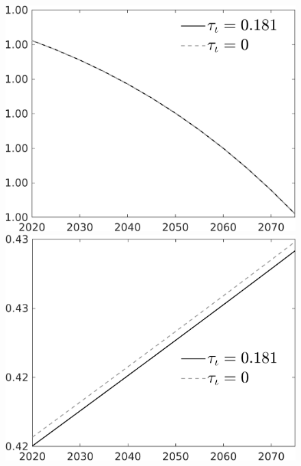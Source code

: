 \begin{figure}[h!!]
\begin{minipage}[]{0.32\textwidth}
\end{minipage}
\begin{minipage}[]{0.32\textwidth}
\includegraphics[width=1\textwidth]{../../codding_model/own_basedOnFried/optimalPol_010922_revision/figures/all_13Sept22/CompTauf_bytaul_Reg0_snS_spillover0_nsk0_xgr0_knspil0_sep0_LFlimit0_emsbase0_countec0_GovRev0_etaa0.79_lgd1.png}
\end{minipage}
\begin{minipage}[]{0.32\textwidth}
\includegraphics[width=1\textwidth]{../../codding_model/own_basedOnFried/optimalPol_010922_revision/figures/all_13Sept22/CompTauf_bytaul_Reg0_GFF_spillover0_nsk0_xgr0_knspil0_sep0_LFlimit0_emsbase0_countec0_GovRev0_etaa0.79_lgd1.png}

\end{minipage}
\end{figure}
